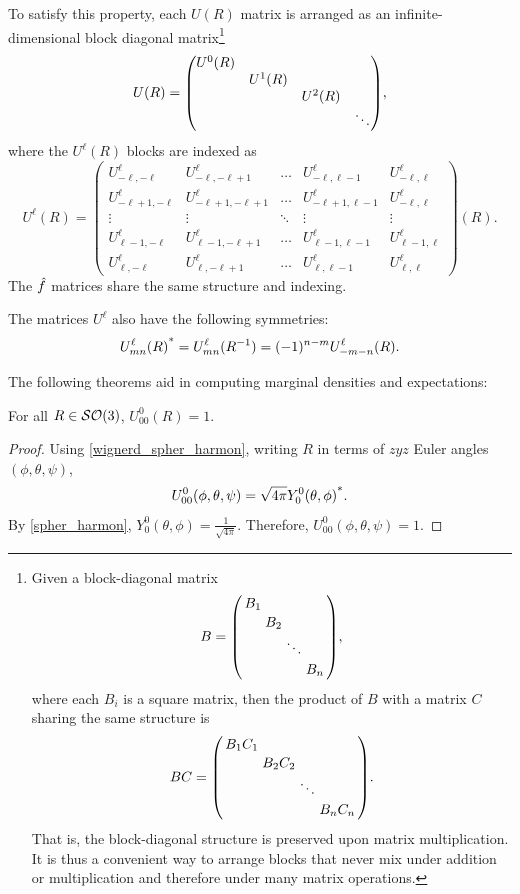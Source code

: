 \documentclass[../../main.tex]{subfiles}
\begin{document}
\begin{refsection}
	To satisfy this property, each $U(R)$ matrix is arranged as an infinite-dimensional block diagonal matrix\footnote{
		Given a block-diagonal matrix
		$$B = \smqty(\dmat{B_1, B_2, \ddots, B_n}),$$
		where each $B_i$ is a square matrix, then the product of $B$ with a matrix $C$ sharing the same structure is
		$$B C = \smqty(\dmat{B_1 C_1, B_2 C_2, \ddots, B_n C_n}).$$
		That is, the block-diagonal structure is preserved upon matrix multiplication.
		It is thus a convenient way to arrange blocks that never mix under addition or multiplication and therefore under many matrix operations.
	}
	$$U(R) = \mqty(\dmat{U^0(R), U^1(R), U^2(R), \ddots}),$$
	where the $U^\ell(R)$ blocks are indexed as
	$$U^\ell(R) = \begin{pmatrix}
			U^\ell_{-\ell,-\ell}   & U^\ell_{-\ell, -\ell+1}   & \hdots & U^\ell_{-\ell, \ell-1}   & U^\ell_{-\ell, \ell} \\
			U^\ell_{-\ell+1,-\ell} & U^\ell_{-\ell+1, -\ell+1} & \hdots & U^\ell_{-\ell+1, \ell-1} & U^\ell_{-\ell, \ell} \\
			\vdots                 & \vdots                    & \ddots & \vdots                   & \vdots               \\
			U^\ell_{\ell-1,-\ell}  & U^\ell_{\ell-1,-\ell+1}   & \hdots & U^\ell_{\ell-1,\ell-1}   & U^\ell_{\ell-1,\ell} \\
			U^\ell_{\ell,-\ell}    & U^\ell_{\ell,-\ell+1}     & \hdots & U^\ell_{\ell,\ell-1}     & U^\ell_{\ell,\ell}
		\end{pmatrix}(R).$$
	The $\hat{f}$ matrices share the same structure and indexing.

	The matrices $U^\ell$ also have the following symmetries\footnotemark:
	$${U^\ell_{mn}(R)}^* = U^\ell_{mn}(R^{-1}) = (-1)^{n-m} U^\ell_{-m-n}(R).$$

	The following theorems aid in computing marginal densities and expectations:

	\begin{theorem}\label{so3_iur_zeroth_term}
		For all $R \in \mathcal{SO} (3)$, $U^0_{00}(R) = 1$.
	\end{theorem}
	\begin{proof}
		Using \cref{wignerd_spher_harmon}, writing $R$ in terms of $zyz$ Euler angles $(\phi, \theta, \psi)$,
		$$U^0_{00}(\phi, \theta, \psi) = \sqrt{4\pi} {Y^0_0(\theta, \phi)}^*.$$
		By \cref{spher_harmon}, $Y^0_0(\theta, \phi) = \frac{1}{\sqrt{4\pi}}$.
		Therefore, $U^0_{00}(\phi, \theta, \psi) = 1$.
	\end{proof}


\end{refsection}
\end{document}
